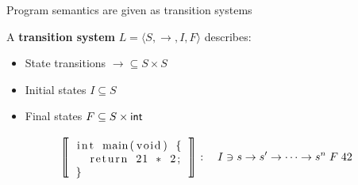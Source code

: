 \documentclass[aspectratio=169,mathserif]{beamer}
\begin{document}
\begin{frame}[fragile]{Program semantics are given as transition systems} %
  \begin{definition}
  A \textbf{transition system}
  $
    L = \langle S, {\rightarrow}, I, F \rangle
  $
  describes:
  \begin{itemize}
    \item State transitions ${\rightarrow} \subseteq S \times S$
    \item Initial states $I \subseteq S$
    \item Final states $F \subseteq S \times  \mathsf{int} $
  \end{itemize}
  \end{definition}

  \begin{example}
  \[
    \left\llbracket
    \begin{tabular}{c}
      \begin{lstlisting}
int main(void) {
  return 21 * 2;
}
      \end{lstlisting}
    \end{tabular}
    \right\rrbracket : \quad
    I \ni
    s \rightarrow
    s' \rightarrow
    \cdots \rightarrow
    s^n \mathrel{F}
    42
  \]
  \end{example}
\end{frame}
\end{document}
